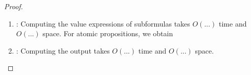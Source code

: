 \begin{proof}
\begin{enumerate}
		
		
		\item \TODO:
		Computing the value expressions of subformulas takes $O(...)$ time %
		and $O(...)$ space. %
		For atomic propositions, we obtain 
		
		
		
		\item \TODO:
		Computing the output takes $O(...)$ time %
		and $O(...)$ space. %
	\end{enumerate}
	
%	
%	
	
%	
%	
%	
%	
%	
\end{proof}